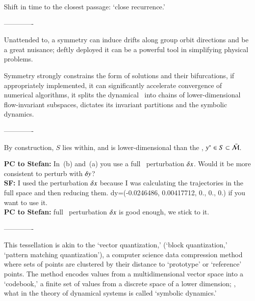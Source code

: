Shift in time to the closest passage:
`close recurrence.'

-------------

Unattended to, a symmetry can induce drifts along group orbit directions
and be a great nuisance; deftly deployed it can be a powerful tool in
simplifying physical problems.

Symmetry strongly constrains the form of solutions and their
bifurcations, if appropriately implemented, it can significantly
accelerate convergence of numerical algorithms, it splits the dynamical
\statesp\ into chains of lower-dimensional flow-invariant subspaces,
dictates its invariant partitions and the symbolic dynamics.

-------------

By construction, $S$ lies within, and is lower-dimensional than
the \reducedsp, $y^* \in S \subset \bar{\cal M}$.

	{\bf PC to Stefan:} In \,(b) and \,(a)
you use a full \statesp\ perturbation $\delta x$. Would it be more consistent
to perturb with $\delta y$?
\\
    {\bf SF:} I used the perturbation $\delta x$ because I was calculating
    the trajectories in the full space and then reducing them.
    dy=(-0.0246486, 0.00417712, 0., 0., 0.) if you want to use it.
\\
{\bf PC to Stefan:}
full \statesp\ perturbation $\delta x$ is good enough, we stick to it.

-------------

%


 This tessellation is akin to the
{`vector quantization,'} (`block quantization,'  `pattern matching quantization'),
a computer science data compression method where sets of points are
clustered by their distance to `prototype' or `reference' points. The
method encodes values from a multidimensional vector space into a
`codebook,' a finite set of values from a discrete space of a lower
dimension; \ie, what in the theory of dynamical systems is called
`symbolic dynamics.'

